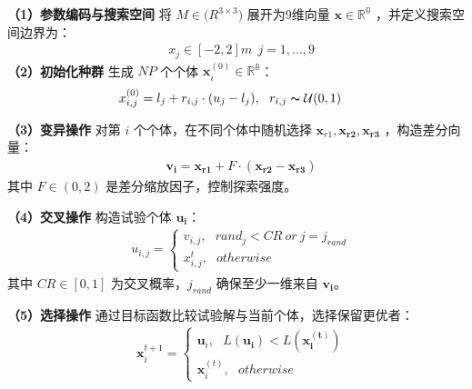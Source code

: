 \noindent\textbf{（1）参数编码与搜索空间}
将 $M\in \mathbb(R^{3\times 3})$ 展开为9维向量 $\mathbf{x}\in \mathbb{R^{9}}$ ，并定义搜索空间边界为：
\begin{equation}
\begin{aligned}
  &x_{j}\in [-2,2]m\ \ j=1,...,9
\end{aligned}
\end{equation}
\noindent\textbf{（2）初始化种群}
生成 $NP$ 个个体 $\mathbf{x}_{i}^{(0)}\in \mathbb{R^{9}}$：
\begin{equation}
\begin{aligned}
  &x^{(0)}_{i,j}=l_{j}+r_{i,j}\cdot (u_{j}-l_{j}),\ \ r_{i,j}\thicksim \mathcal{U}(0,1)
\end{aligned}
\end{equation}

\noindent\textbf{（3）变异操作}
对第 $i$ 个个体，在不同个体中随机选择 $\mathbf{x}_{r1},\mathbf{x_{r2}},\mathbf{x_{r3}}$ ，构造差分向量：
\begin{equation}
\begin{aligned}
  &\mathbf{v_{i}}=\mathbf{x_{r1}}+F\cdot (\mathbf{x_{r2}}-\mathbf{x_{r3}})
\end{aligned}
\end{equation}
其中 $F\in (0,2)$ 是差分缩放因子，控制探索强度。

\noindent\textbf{（4）交叉操作}
构造试验个体 $\mathbf{u_{i}}$：
\begin{equation}
\begin{aligned}
  &u_{i,j}=
  \begin{cases}
    v_{i,j},\ \ \ rand_{j}<CR\ or\ j=j_{rand}\\
    x_{i,j}^{t},\ \ \ otherwise
  \end{cases}
\end{aligned}
\end{equation}
其中 $CR\in [0,1]$ 为交叉概率，$j_{rand}$ 确保至少一维来自 $\mathbf{v_{i}}$。

\noindent\textbf{（5）选择操作}
通过目标函数比较试验解与当前个体，选择保留更优者：
\begin{equation}
\begin{aligned}
  &\mathbf{x}_{i}^{t+1}=
  \begin{cases}
    \mathbf{u}_{i},\ \ \ L(\mathbf{u_{i}})<L(\mathbf{x^{(t)}_{i}})\\
    \mathbf{x}_{i}^{(t)},\ \ \ otherwise
  \end{cases}
\end{aligned}
\end{equation}

